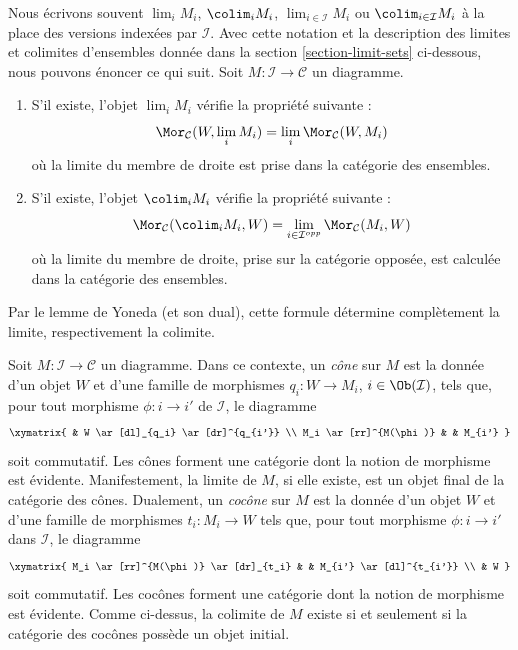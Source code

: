 \begin{remark}
\label{remark-limit-colim}
Nous écrivons souvent $\lim_i M_i$, $\colim_i M_i$,
$\lim_{i\in \mathcal{I}} M_i$ ou $\colim_{i\in \mathcal{I}} M_i$
à la place des versions indexées par $\mathcal{I}$.
Avec cette notation et la description des limites et colimites d'ensembles
donnée dans la section \ref{section-limit-sets} ci-dessous,
nous pouvons énoncer ce qui suit.
Soit $M : \mathcal{I} \to \mathcal{C}$ un diagramme.
\begin{enumerate}
\item S'il existe, l'objet $\lim_i M_i$ vérifie la propriété suivante :
$$
\Mor_\mathcal{C}(W, \lim_i M_i)
=
\lim_i \Mor_\mathcal{C}(W, M_i)
$$
où la limite du membre de droite est prise dans la catégorie des ensembles.
\item S'il existe, l'objet $\colim_i M_i$ vérifie la propriété suivante :
$$
\Mor_\mathcal{C}(\colim_i M_i, W)
=
\lim_{i \in \mathcal{I}^{opp}} \Mor_\mathcal{C}(M_i, W)
$$
où la limite du membre de droite, prise sur la catégorie opposée, est calculée
dans la catégorie des ensembles.
\end{enumerate}
Par le lemme de Yoneda (et son dual), cette formule détermine complètement
la limite, respectivement la colimite.
\end{remark}

\begin{remark}
\label{remark-cones-and-cocones}
Soit $M : \mathcal{I} \to \mathcal{C}$ un diagramme. Dans ce contexte,
un {\it cône} sur $M$ est la donnée d'un objet $W$ et d'une famille de
morphismes $q_i : W \to M_i$, $i \in \Ob(\mathcal{I})$, tels que, pour tout
morphisme $\phi : i \to i'$ de $\mathcal{I}$, le diagramme
$$
\xymatrix{
& W \ar[dl]_{q_i} \ar[dr]^{q_{i'}} \\
M_i \ar[rr]^{M(\phi)} & & M_{i'}
}
$$
soit commutatif. Les cônes forment une catégorie dont la notion de morphisme
est évidente. Manifestement, la limite de $M$, si elle existe, est un objet
final de la catégorie des cônes. Dualement, un {\it cocône} sur $M$ est la
donnée d'un objet $W$ et d'une famille de morphismes $t_i : M_i \to W$ tels
que, pour tout morphisme $\phi : i \to i'$ dans $\mathcal{I}$, le diagramme
$$
\xymatrix{
M_i \ar[rr]^{M(\phi)} \ar[dr]_{t_i} & & M_{i'} \ar[dl]^{t_{i'}} \\
& W
}
$$
soit commutatif. Les cocônes forment une catégorie dont la notion de
morphisme est évidente. Comme ci-dessus, la colimite de $M$ existe si et
seulement si la catégorie des cocônes possède un objet initial.
\end{remark}

